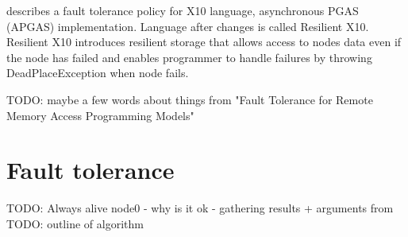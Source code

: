 \documentclass{llncs}
\begin{document}
\cite{RX10} describes a fault tolerance policy for X10 language, asynchronous PGAS (APGAS) implementation.
Language after changes is called Resilient X10.
Resilient X10 introduces resilient storage that allows access to nodes data even if the node has failed
and enables programmer to handle failures by throwing DeadPlaceException when node fails.

TODO: maybe a few words about things from "Fault Tolerance for Remote Memory Access Programming Models"

\section{Fault tolerance}
TODO: Always alive node0 - why is it ok - gathering results + arguments from \cite{shmem}
TODO: outline of algorithm
\end{document}
